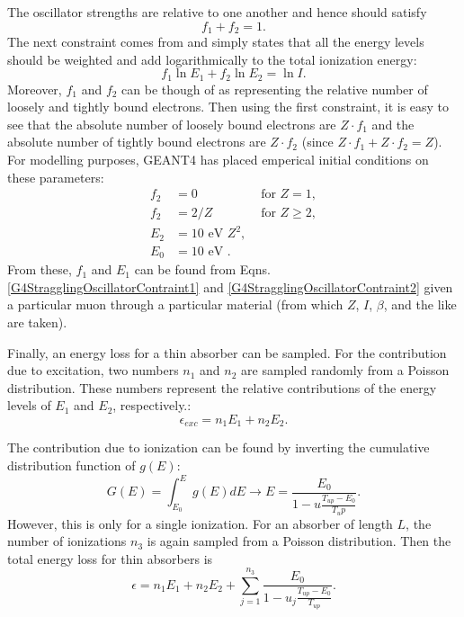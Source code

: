The oscillator strengths are relative to one another and hence should satisfy
\begin{equation}\label{eqn:G4StragglingOscillatorConstraint1}
f_1+f_2=1.
\end{equation}
The next constraint comes from \cite{bichsel1988} and simply states that all the energy levels should be weighted and add logarithmically to the total ionization energy:
\begin{equation}\label{eqn:G4StragglingOscillatorConstraint2}
f_1 \ln E_1 + f_2 \ln E_2 = \ln I.
\end{equation}
Moreover, $f_1$ and $f_2$ can be though of as representing the relative number of loosely and tightly bound electrons. Then using the first constraint, it is easy to see that the absolute number of loosely bound electrons are $Z\cdot f_1$ and the absolute number of tightly bound electrons are $Z\cdot f_2$ (since $Z\cdot f_1+Z\cdot f_2=Z$). For modelling purposes, GEANT4 has placed emperical initial conditions on these parameters:
\begin{align} \label{eqn:G4StragglingOscillatorConstraint3}
f_2 & = 0 & \text{   for   } Z=1,\\
f_2 & = 2/Z & \text{     for     } Z\ge 2,\\
E_2 & = 10 \text{ eV } Z^2,\\
E_0 &= 10 \text{ eV }.
\end{align}
From these, $f_1$ and $E_1$ can be found from Eqns. \ref{G4StragglingOscillatorContraint1} and \ref{G4StragglingOscillatorContraint2} given a particular muon through a particular material (from which $Z$, $I$, $\beta$, and the like are taken).

Finally, an energy loss for a thin absorber can be sampled. For the contribution due to excitation, two numbers $n_1$ and $n_2$ are sampled randomly from a Poisson distribution. These numbers represent the relative contributions of the energy levels of $E_1$ and $E_2$, respectively.:
\begin{equation}\nonumber
\epsilon_{exc}=n_1 E_1 + n_2 E_2.
\end{equation}

The contribution due to ionization can be found by inverting the cumulative distribution function of $g(E)$:
\begin{equation}\nonumber
G(E)=\int_{E_0}^E g(E) dE \rightarrow E=\frac{E_0}{1-u\frac{T_{up}-E_0}{T_up}}.
\end{equation}
However, this is only for a single ionization. For an absorber of length $L$, the number of ionizations $n_3$ is again sampled from a Poisson distribution. Then the total energy loss for thin absorbers is
\begin{equation}\label{G4StragglingThin}
\epsilon = n_1 E_1 + n_2 E_2 + \sum_{j=1}^{n_3} \frac{E_0}{1-u_j \frac{T_{up}-E_0}{T_{up}}}.
\end{equation}


